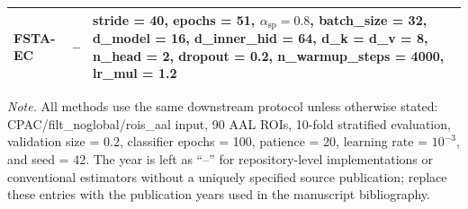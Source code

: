 \begin{table}[t]
\begin{tabularx}{\textwidth}{@{}>{\raggedright\arraybackslash}p{}c>{\raggedright\arraybackslash}X@{}}
        FSTA-EC & -- & \makecell[l]{stride = 40, epochs = 51, $\alpha_{\mathrm{sp}} = 0.8$, batch\_size = 32,\\ d\_model = 16, d\_inner\_hid = 64, d\_k = d\_v = 8, n\_head = 2,\\ dropout = 0.2, n\_warmup\_steps = 4000, lr\_mul = 1.2} \\
        \bottomrule
    \end{tabularx}
    \vspace{-2pt}
    \begin{minipage}{0.96\textwidth}
        \footnotesize
        \emph{Note.} All methods use the same downstream protocol unless otherwise stated:
        CPAC/filt\_noglobal/rois\_aal input, 90 AAL ROIs, 10-fold stratified evaluation,
        validation size = 0.2, classifier epochs = 100, patience = 20,
        learning rate = $10^{-3}$, and seed = 42. The year is left as ``--'' for
        repository-level implementations or conventional estimators without a
        uniquely specified source publication; replace these entries with the
        publication years used in the manuscript bibliography.
    \end{minipage}
\end{table}
